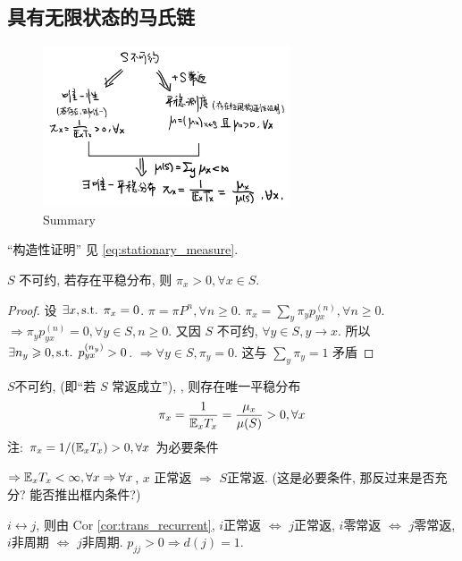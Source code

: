 \subsection{具有无限状态的马氏链}

\begin{figure}[H]
    \centering
    \includegraphics[width=0.65\textwidth]{figures/irreduce_summary.png}
    \caption{Summary}
\end{figure}

``构造性证明'' 见 \eqref{eq:stationary_measure}.

\begin{claim}
$S$ 不可约, 若存在平稳分布, 则 $\pi_x>0,\forall x\in S$.
\end{claim}

\begin{proof}
    设 $\exists x, \text{s.t. } \pi_x=0$. $\pi=\pi P^n, \forall n\geq 0$. $\pi_x=\sum_y\pi_y p_{yx}^{(n)}, \forall n\geq 0$. $\Rightarrow \pi_y p_{yx}^{(n)}=0,\forall y\in S,n\geq 0$. 又因 $S$ 不可约, $\forall y\in S, y\to x$. 所以 $\exists n_y\geqslant 0, \text{s.t. } p_{yx}^{(n_y)}>0$. $\Rightarrow \forall y\in S, \pi_y=0$. 这与 $\sum_y\pi_y=1$ 矛盾
\end{proof}

\begin{lemma}\label{lem:p84}
    $S$不可约,  (即``若 $S$ 常返成立''), , 则存在唯一平稳分布
    \begin{equation}
    \pi_x=\frac{1}{\mathbb E_xT_x}=\frac{\mu_x}{\mu(S)}>0,\forall x
    \end{equation}
    注: $\pi_x=1/(\mathbb E_xT_x)>0,\forall x$ 为必要条件

    $\Rightarrow \mathbb E_xT_x<\infty, \forall x\Rightarrow \forall x$, $x$ 正常返 $\Rightarrow$ $S$正常返. (这是必要条件, 那反过来是否充分? 能否推出框内条件?)
\end{lemma}

$i \leftrightarrow j$, 则由 Cor \ref{cor:trans_recurrent}, $i$正常返 $\iff$ $j$正常返, $i$零常返 $\iff$ $j$零常返, $i$非周期 $\iff$ $j$非周期. $p_{jj}>0\Rightarrow d(j)=1$. 


